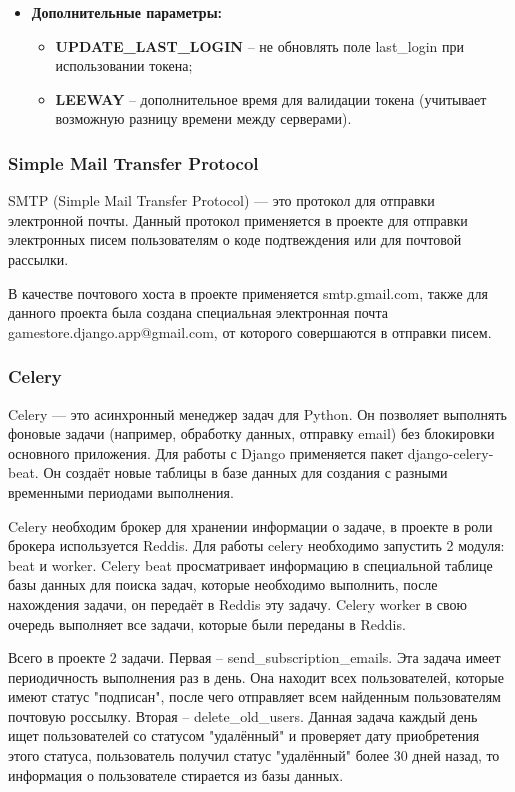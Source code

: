 \documentclass[a4paper,14pt]{extarticle}
\begin{document}
\begin{itemize}
		\item \textbf{Дополнительные параметры:}
		\begin{itemize}
			\item \textbf{UPDATE\_LAST\_LOGIN} -- не обновлять поле last\_login при использовании токена;
			\item \textbf{LEEWAY} -- дополнительное время для валидации токена (учитывает возможную разницу времени между серверами).
		\end{itemize}
	\end{itemize}
	
	\subsubsection{Simple Mail Transfer Protocol}
	SMTP (Simple Mail Transfer Protocol) — это протокол для отправки электронной почты. Данный протокол применяется в проекте для отправки электронных писем пользователям о коде подтвеждения или для почтовой рассылки.
	
	В качестве почтового хоста в проекте применяется smtp.gmail.com, также для данного проекта была создана специальная электронная почта gamestore.django.app@gmail.com, от которого совершаются в отправки писем.
	
	\subsubsection{Celery}
	Celery — это асинхронный менеджер задач для Python. Он позволяет выполнять фоновые задачи (например, обработку данных, отправку email) без блокировки основного приложения. Для работы с Django применяется пакет django-celery-beat. Он создаёт новые таблицы в базе данных для создания с разными временными периодами выполнения.
	
	Celery необходим брокер для хранении информации о задаче, в проекте в роли брокера используется Reddis. Для работы celery необходимо запустить 2 модуля: beat и worker. Celery beat просматривает информацию в специальной таблице базы данных для поиска задач, которые необходимо выполнить, после нахождения задачи, он передаёт в Reddis эту задачу. Celery worker в свою очередь выполняет все задачи, которые были переданы в Reddis.
	
	Всего в проекте 2 задачи. Первая -- send\_subscription\_emails. Эта задача имеет периодичность выполнения раз в день. Она находит всех пользователей, которые имеют статус "подписан", после чего отправляет всем найденным пользователям почтовую россылку. Вторая -- delete\_old\_users. Данная задача каждый день ищет пользователей со статусом "удалённый" и проверяет дату приобретения этого статуса, пользователь получил статус "удалённый" более 30 дней назад, то информация о пользователе стирается из базы данных.
	
\end{document}
